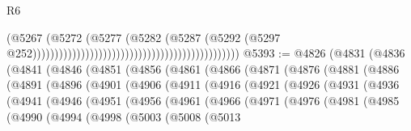 \begin{lexlean}{R6}
\begin{coremodule}
                                                                                    (@5267
                                                                                      (@5272
                                                                                        (@5277
                                                                                          (@5282
                                                                                            (@5287
                                                                                              (@5292
                                                                                                (@5297
                                                                                                  @252)))))))))))))))))))))))))))))))))))))))))))))))
@5393 := @4826
    (@4831
      (@4836
        (@4841
          (@4846
            (@4851
              (@4856
                (@4861
                  (@4866
                    (@4871
                      (@4876
                        (@4881
                          (@4886
                            (@4891
                              (@4896
                                (@4901
                                  (@4906
                                    (@4911
                                      (@4916
                                        (@4921
                                          (@4926
                                            (@4931
                                              (@4936
                                                (@4941
                                                  (@4946
                                                    (@4951
                                                      (@4956
                                                        (@4961
                                                          (@4966
                                                            (@4971
                                                              (@4976
                                                                (@4981
                                                                  (@4985
                                                                    (@4990
                                                                      (@4994
                                                                        (@4998
                                                                          (@5003
                                                                            (@5008
                                                                              (@5013

\end{coremodule}
\end{lexlean}
